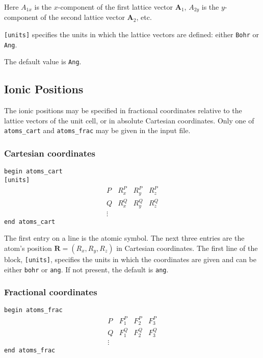 Here $A_{1x}$ is the $x$-component of the first lattice vector $\mathbf{A}_1$,
$A_{2y}$ is the $y$-component of the second lattice vector $\mathbf{A}_2$, etc.

\verb#[units]# specifies the units in which the lattice vectors are
defined: either \verb#Bohr# or \verb#Ang#.

The default value is \verb#Ang#.



\subsection[Ionic Positions]{Ionic Positions}

The ionic positions may be specified in fractional coordinates relative
to the lattice vectors of the unit cell, or in absolute Cartesian coordinates.
Only one of \verb#atoms_cart# and \verb#atoms_frac# may be given in the input
file.


\subsubsection{Cartesian coordinates}

\noindent \verb#begin atoms_cart# \\
\verb#[units]#
$$
\begin{array}{cccc}
P  & R^{P}_{x} & R^{P}_{y} & R^{P}_{z} \\
Q  & R^{Q}_{x} & R^{Q}_{y} & R^{Q}_{z} \\
\vdots
\end{array}
$$
\verb#end atoms_cart#


The first entry on a line is the atomic symbol. The next three entries
are the atom's position $\mathbf{R}=(R_x , R_y, R_z)$ in Cartesian
coordinates. The first line of the block, \verb#[units]#, specifies
the units in which the coordinates are given and can be either
\verb#bohr# or \verb#ang#. If not present, the default is \verb#ang#.

\subsubsection{Fractional coordinates}

\noindent \verb#begin atoms_frac#
$$
\begin{array}{cccc}
P  & F^{P}_{1} & F^{P}_{2} & F^{P}_{3} \\
Q  & F^{Q}_{1} & F^{Q}_{2} & F^{Q}_{3} \\
\vdots
\end{array}
$$
\verb#end atoms_frac#

